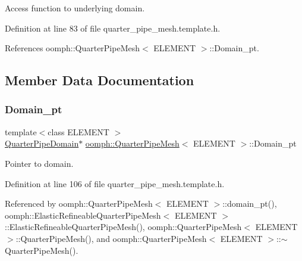 Access function to underlying domain. 



Definition at line 83 of file quarter\+\_\+pipe\+\_\+mesh.\+template.\+h.



References oomph\+::\+Quarter\+Pipe\+Mesh$<$ E\+L\+E\+M\+E\+N\+T $>$\+::\+Domain\+\_\+pt.



\subsection{Member Data Documentation}
\mbox{\label{classoomph_1_1QuarterPipeMesh_a1b3656a71bc9f6159aa237d3a76d5a15}} 
\subsubsection{\texorpdfstring{Domain\+\_\+pt}{Domain\_pt}}
{\footnotesize\ttfamily template$<$class E\+L\+E\+M\+E\+NT $>$ \\
\hyperlink{classoomph_1_1QuarterPipeDomain}{Quarter\+Pipe\+Domain}$\ast$ \hyperlink{classoomph_1_1QuarterPipeMesh}{oomph\+::\+Quarter\+Pipe\+Mesh}$<$ E\+L\+E\+M\+E\+NT $>$\+::Domain\+\_\+pt\hspace{0.3cm}{\ttfamily [protected]}}



Pointer to domain. 



Definition at line 106 of file quarter\+\_\+pipe\+\_\+mesh.\+template.\+h.



Referenced by oomph\+::\+Quarter\+Pipe\+Mesh$<$ E\+L\+E\+M\+E\+N\+T $>$\+::domain\+\_\+pt(), oomph\+::\+Elastic\+Refineable\+Quarter\+Pipe\+Mesh$<$ E\+L\+E\+M\+E\+N\+T $>$\+::\+Elastic\+Refineable\+Quarter\+Pipe\+Mesh(), oomph\+::\+Quarter\+Pipe\+Mesh$<$ E\+L\+E\+M\+E\+N\+T $>$\+::\+Quarter\+Pipe\+Mesh(), and oomph\+::\+Quarter\+Pipe\+Mesh$<$ E\+L\+E\+M\+E\+N\+T $>$\+::$\sim$\+Quarter\+Pipe\+Mesh().

\mbox{\label{classoomph_1_1QuarterPipeMesh_a00530b53de926a9a4f37cace7e2ffbdb}} 
